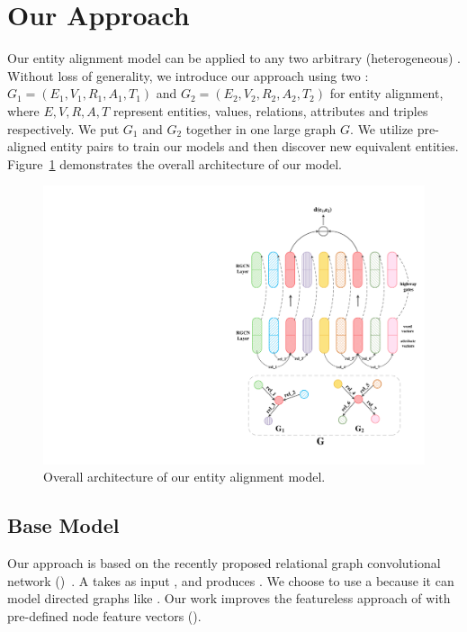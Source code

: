 
	\section{Our Approach}
	\label{section:app}
    Our entity alignment model can be applied to any two arbitrary (heterogeneous) \KGs. Without loss of generality, we introduce our approach
  using two \KGs: $G_1 = (E_1,V_1,R_1,A_1,T_1)$ and $G_2 = (E_2,V_2,R_2,A_2,T_2)$ for entity alignment, where
$E,V,R,A,T$ represent entities, values, relations, attributes and triples respectively.
	We put $G_1$ and $G_2$ together in one large graph $G$. We utilize pre-aligned entity pairs to train our models and then discover new
equivalent entities. Figure~\ref{all} demonstrates the overall architecture of our model.
	
	
	\begin{figure}[t!]
		\begin{center}
			\includegraphics[width=0.8\linewidth]{figures/graph2.pdf}
			\caption{Overall architecture of our entity alignment model.}
			\label{all}
		\end{center}
	\end{figure}
	
    \subsection{Base Model}
    Our approach is based on the recently proposed relational graph convolutional network (\RGCN)~\cite{Schlichtkrull2017Modeling}. A \RGCN takes as
    input , and produces . We choose to use a \RGCN because it can model directed graphs like \KGs. Our work improves the
    featureless approach of \RGCN with pre-defined node feature vectors ().


